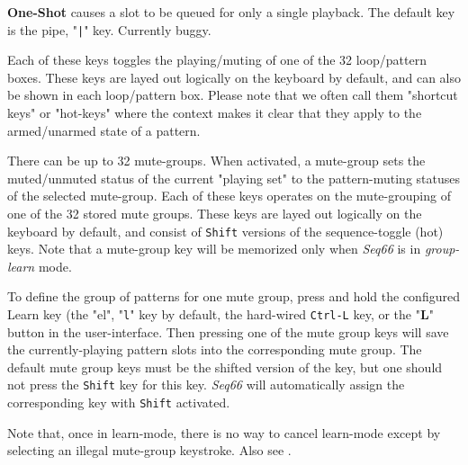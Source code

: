    \textbf{One-Shot}
   causes a slot to be queued for only a single playback.
   The default key is the pipe, "\texttt{|}" key.
   Currently buggy.

   Each of these keys toggles the playing/muting of one of the 32
   loop/pattern boxes.
   These keys are layed out logically on the keyboard by default,
   and can also be shown in each loop/pattern box.
   Please note that we often call them "shortcut keys" or "hot-keys"
   where the context
   makes it clear that they apply to the armed/unarmed state of a pattern.

   There can be up to 32 mute-groups.
   When activated, a mute-group
   sets the muted/unmuted status of the current "playing set"
   to the pattern-muting statuses of the selected mute-group.
   Each of these keys operates on the mute-grouping of one of the 32
   stored mute groups.
   These keys are layed out logically on the keyboard by default, and consist
   of \texttt{Shift} versions of the sequence-toggle (hot) keys.
   Note that a mute-group key will be memorized only when
   \textsl{Seq66} is in
   \textsl{group-learn} mode.



   To define the group of patterns for one mute group, press and hold the
   configured Learn key (the "el", "\texttt{l}" key by default,
   the hard-wired \texttt{Ctrl-L} key, or the "\textbf{L}"
   button in the user-interface.
   Then pressing one of the mute group keys
   will save the currently-playing pattern slots into the corresponding mute
   group.
   The default mute group keys must be the shifted version of the key,
   but one should not press the \texttt{Shift} key for this key.
   \textsl{Seq66} will automatically assign the corresponding key with
   \texttt{Shift} activated.

   Note that, once in learn-mode, there is no way to cancel learn-mode
   except by selecting an illegal mute-group keystroke.
   Also see .

